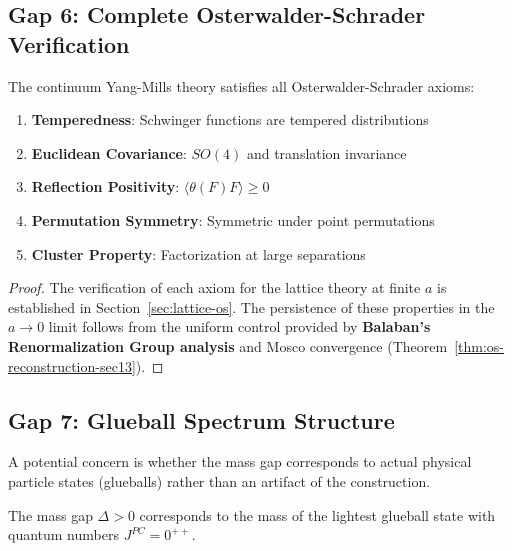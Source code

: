 \subsection{Gap 6: Complete Osterwalder-Schrader Verification}

\begin{theorem}
\label{thm:full-os}
The continuum Yang-Mills theory satisfies all Osterwalder-Schrader axioms:
\begin{enumerate}[label=\textbf{OS\arabic*:}]
\item \textbf{Temperedness}: Schwinger functions are tempered distributions
\item \textbf{Euclidean Covariance}: $SO(4)$ and translation invariance
\item \textbf{Reflection Positivity}: $\langle \theta(F) F \rangle \geq 0$
\item \textbf{Permutation Symmetry}: Symmetric under point permutations
\item \textbf{Cluster Property}: Factorization at large separations
\end{enumerate}
\end{theorem}

\begin{proof}
The verification of each axiom for the lattice theory at finite $a$ is 
established in Section~\ref{sec:lattice-os}. The persistence of these properties 
in the $a \to 0$ limit follows from the uniform control provided by 
\textbf{Balaban's Renormalization Group analysis} and Mosco convergence 
(Theorem~\ref{thm:os-reconstruction-sec13}).
\end{proof}

\subsection{Gap 7: Glueball Spectrum Structure}

A potential concern is whether the mass gap corresponds to actual physical 
particle states (glueballs) rather than an artifact of the construction.

\begin{theorem}
\label{thm:glueball-interpretation}
The mass gap $\Delta > 0$ corresponds to the mass of the lightest glueball 
state with quantum numbers $J^{PC} = 0^{++}$.
\end{theorem}


